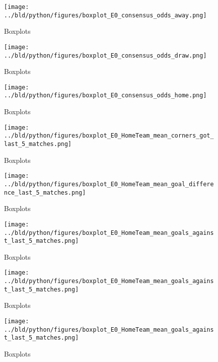 \documentclass[11pt, a4paper, leqno]{article}
\begin{document}
\begin{figure}[H]
    \centering
    \texttt{[image: ../bld/python/figures/boxplot\_E0\_consensus\_odds\_away.png]}
    \caption{Boxplots}
    \label{fig:figure2}
\end{figure}

\begin{figure}[H]
    \centering
    \texttt{[image: ../bld/python/figures/boxplot\_E0\_consensus\_odds\_draw.png]}
    \caption{Boxplots}
    \label{fig:figure2}
\end{figure}

\begin{figure}[H]
    \centering
    \texttt{[image: ../bld/python/figures/boxplot\_E0\_consensus\_odds\_home.png]}
    \caption{Boxplots}
    \label{fig:figure2}
\end{figure}

\begin{figure}[H]
    \centering
    \texttt{[image: ../bld/python/figures/boxplot\_E0\_HomeTeam\_mean\_corners\_got\_last\_5\_matches.png]}
    \caption{Boxplots}
    \label{fig:figure2}
\end{figure}

\begin{figure}[H]
    \centering
    \texttt{[image: ../bld/python/figures/boxplot\_E0\_HomeTeam\_mean\_goal\_difference\_last\_5\_matches.png]}
    \caption{Boxplots}
    \label{fig:figure2}
\end{figure}


\begin{figure}[H]
    \centering
    \texttt{[image: ../bld/python/figures/boxplot\_E0\_HomeTeam\_mean\_goals\_against\_last\_5\_matches.png]}
    \caption{Boxplots}
    \label{fig:figure2}
\end{figure}

\begin{figure}[H]
    \centering
    \texttt{[image: ../bld/python/figures/boxplot\_E0\_HomeTeam\_mean\_goals\_against\_last\_5\_matches.png]}
    \caption{Boxplots}
    \label{fig:figure2}
\end{figure}

\begin{figure}[H]
    \centering
    \texttt{[image: ../bld/python/figures/boxplot\_E0\_HomeTeam\_mean\_goals\_against\_last\_5\_matches.png]}
    \caption{Boxplots}
    \label{fig:figure2}
\end{figure}
\end{document}
